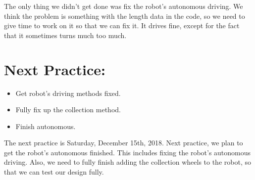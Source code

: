 \documentclass[12pt]{article}
\begin{document}
The only thing we didn't get done was fix the robot's autonomous driving. We think the problem is something with the length data in the code, so we need to give time to work on it so that we can fix it. It drives fine, except for the fact that it sometimes turns much too much.

\section{Next Practice:}
\begin{itemize}
	\item Get robot's driving methods fixed.
	\item Fully fix up the collection method.
	\item Finish autonomous.
\end{itemize}

The next practice is Saturday, December 15th, 2018.
Next practice, we plan to get the robot's autonomous finished. This includes fixing the robot's autonomous driving. Also, we need to fully finish adding the collection wheels to the robot, so that we can test our design fully.
\end{document}
